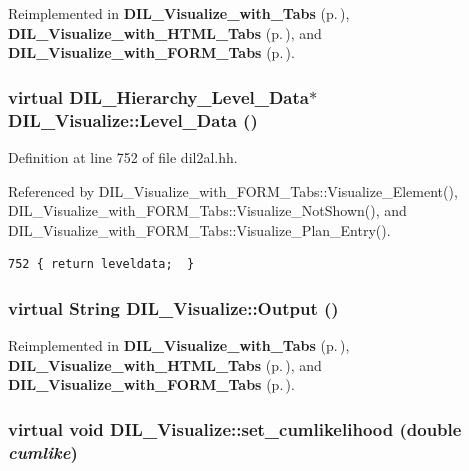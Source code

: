 Reimplemented in {\bf DIL\_\-Visualize\_\-with\_\-Tabs} {\rm (p.\,\pageref{classDIL__Visualize__with__Tabs_a1})}, {\bf DIL\_\-Visualize\_\-with\_\-HTML\_\-Tabs} {\rm (p.\,\pageref{classDIL__Visualize__with__HTML__Tabs_a1})}, and {\bf DIL\_\-Visualize\_\-with\_\-FORM\_\-Tabs} {\rm (p.\,\pageref{classDIL__Visualize__with__FORM__Tabs_a1})}.
\subsubsection{\setlength{\rightskip}{0pt plus 5cm}virtual {\bf DIL\_\-Hierarchy\_\-Level\_\-Data}$\ast$ DIL\_\-Visualize::Level\_\-Data ()\hspace{0.3cm}{\tt  [inline, virtual]}}\label{classDIL__Visualize_a4}




Definition at line 752 of file dil2al.hh.

Referenced by DIL\_\-Visualize\_\-with\_\-FORM\_\-Tabs::Visualize\_\-Element(), DIL\_\-Visualize\_\-with\_\-FORM\_\-Tabs::Visualize\_\-Not\-Shown(), and DIL\_\-Visualize\_\-with\_\-FORM\_\-Tabs::Visualize\_\-Plan\_\-Entry().



\footnotesize\begin{verbatim}752 { return leveldata;  }
\end{verbatim}\normalsize 
{}
\subsubsection{\setlength{\rightskip}{0pt plus 5cm}virtual {\bf String} DIL\_\-Visualize::Output ()\hspace{0.3cm}{\tt  [virtual]}}\label{classDIL__Visualize_a7}




Reimplemented in {\bf DIL\_\-Visualize\_\-with\_\-Tabs} {\rm (p.\,\pageref{classDIL__Visualize__with__Tabs_a4})}, {\bf DIL\_\-Visualize\_\-with\_\-HTML\_\-Tabs} {\rm (p.\,\pageref{classDIL__Visualize__with__HTML__Tabs_a4})}, and {\bf DIL\_\-Visualize\_\-with\_\-FORM\_\-Tabs} {\rm (p.\,\pageref{classDIL__Visualize__with__FORM__Tabs_a4})}.
\subsubsection{\setlength{\rightskip}{0pt plus 5cm}virtual void DIL\_\-Visualize::set\_\-cumlikelihood (double {\em cumlike})\hspace{0.3cm}{\tt  [inline, virtual]}}\label{classDIL__Visualize_a9}




